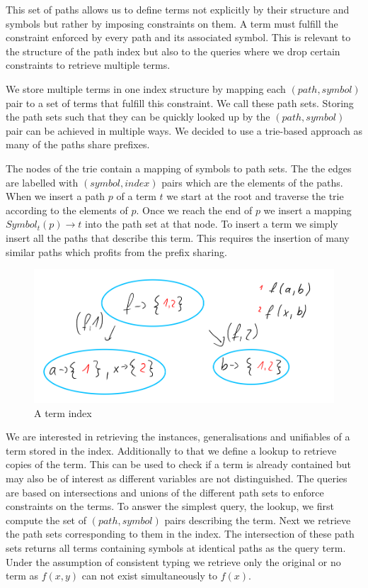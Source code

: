 This set of paths allows us to define terms not explicitly by their structure and symbols but rather by imposing constraints on them. A term must fulfill the constraint enforced by every path and its associated symbol. This is relevant to the structure of the path index but also to the queries where we drop certain constraints to retrieve multiple terms.

We store multiple terms in one index structure by mapping each $(path, symbol)$ pair to a set of terms that fulfill this constraint. We call these path sets. Storing the path sets such that they can be quickly looked up by the $(path, symbol)$ pair can be achieved in multiple ways. We decided to use a trie-based approach as many of the paths share prefixes.

The nodes of the trie contain a mapping of symbols to path sets. The the edges are labelled with $(symbol, index)$ pairs which are the elements of the paths. When we insert a path $p$ of a term $t$ we start at the root and traverse the trie according to the elements of $p$. Once we reach the end of $p$ we insert a mapping $Symbol_{t}(p) \longrightarrow t$ into the path set at that node. To insert a term we simply insert all the paths that describe this term. This requires the insertion of many similar paths which profits from the prefix sharing.

\begin{figure}[h]
\centering
\includegraphics[scale=0.25]{figures/path_index.png}
\caption{A term index}
\end{figure}

We are interested in retrieving the instances, generalisations and unifiables of a term stored in the index. Additionally to that we define a lookup to retrieve copies of the term. This can be used to check if a term is already contained but may also be of interest as different variables are not distinguished. The queries are based on intersections and unions of the different path sets to enforce constraints on the terms.
To answer the simplest query, the lookup, we first compute the set of $(path, symbol)$ pairs describing the term. Next we retrieve the path sets corresponding to them in the index. The intersection of these path sets returns all terms containing symbols at identical paths as the query term. Under the assumption of consistent typing we retrieve only the original or no term as $f(x,y)$ can not exist simultaneously to $f(x)$.

